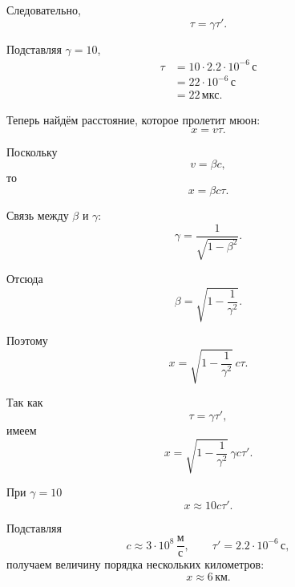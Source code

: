 \documentclass[../final.tex]{subfiles}
\begin{document}
Следовательно,
%
\begin{equation*}
    \tau
    =
    \gamma\tau'.
\end{equation*}

Подставляя $\gamma=10$,
%
\begin{align*}
    \tau
    &=
    10\cdot2.2\cdot10^{-6}\,\text{с}
    \\[3pt]
    &=
    22\cdot10^{-6}\,\text{с}
    \\[3pt]
    &=
    22\,\text{мкс}.
\end{align*}

Теперь найдём расстояние, которое пролетит мюон:
%
\begin{equation*}
    x
    =
    v\tau.
\end{equation*}

Поскольку
%
\begin{equation*}
    v=\beta c,
\end{equation*}
%
то
%
\begin{equation*}
    x
    =
    \beta c\tau.
\end{equation*}

Связь между $\beta$ и $\gamma$:
%
\begin{equation*}
    \gamma
    =
    \frac{1}{\sqrt{1-\beta^2}}.
\end{equation*}

Отсюда
%
\begin{equation*}
    \beta
    =
    \sqrt{
        1-\frac{1}{\gamma^2}
    }.
\end{equation*}

Поэтому
%
\begin{equation*}
    x
    =
    \sqrt{
        1-\frac{1}{\gamma^2}
    }\,
    c\tau.
\end{equation*}

Так как
%
\begin{equation*}
    \tau
    =
    \gamma\tau',
\end{equation*}
%
имеем
%
\begin{equation*}
    x
    =
    \sqrt{
        1-\frac{1}{\gamma^2}
    }\,
    \gamma c\tau'.
\end{equation*}

При $\gamma=10$
%
\begin{equation*}
    x
    \approx
    10c\tau'.
\end{equation*}

Подставляя
%
\begin{equation*}
    c
    \approx
    3\cdot10^8\,
    \frac{\text{м}}{\text{с}},
    \qquad
    \tau'
    =
    2.2\cdot10^{-6}\,\text{с},
\end{equation*}
%
получаем величину порядка нескольких километров:
%
\begin{equation*}
    x
    \approx
    6\,\text{км}.
\end{equation*}
\end{document}
